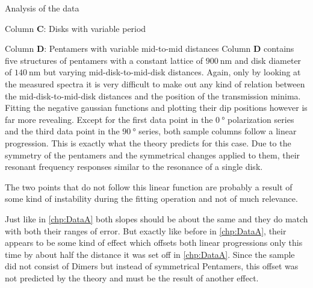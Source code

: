 \documentclass[pdftex, a4paper,11pt, twoside, UKenglish]{report}
\begin{document}
\begin{chapter}{Analysis of the data}
\begin{section}{Column \textbf{C}: Disks with variable period}
    \end{section}
    
    
    
    \newpage
    \begin{section}{Column \textbf{D}: Pentamers with variable mid-to-mid
        distances}
      \label{chp:DataD}
      Column \textbf{D} contains five structures of pentamers with a constant
      lattice of $\SI{900}{\nano\meter}$ and disk diameter of
      $\SI{140}{\nano\meter}$ but varying mid-disk-to-mid-disk distances.
      Again, only by looking at the measured spectra it is very difficult to
      make out any kind of relation between the mid-disk-to-mid-disk distances
      and the position of the transmission minima. Fitting the negative gaussian
      functions and plotting their dip positions however is far more revealing.
      Except for the first data point in the $\SI{0}{\degree}$ polarization
      series and the third data point in the $\SI{90}{\degree}$ series, both
      sample columns follow a linear progression. This is exactly what the
      theory predicts for this case. Due to the symmetry of the pentamers and
      the symmetrical changes applied to them, their resonant frequency
      responses similar to the resonance of a single disk. 

      The two points that do not follow this linear function are probably a
      result of some kind of instability during the fitting operation and not
      of much relevance.

      Just like in \cref{chp:DataA} both slopes should be about the same and
      they do match with both their ranges of error. But exactly like before in
      \cref{chp:DataA}, their appears to be some kind of effect which offsets
      both linear progressions only this time by about half the distance it
      was set off in \cref{chp:DataA}. Since the sample did not consist of
      Dimers but instead of symmetrical Pentamers, this offset was not predicted
      by the theory and must be the result of another effect.
      

\end{section}
\end{chapter}
\end{document}
